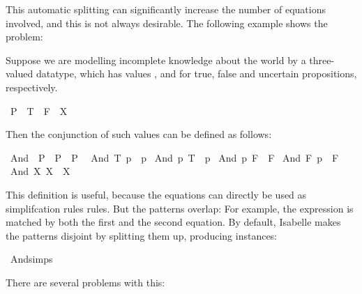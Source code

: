 \begin{isabellebody}
\begin{isamarkuptext}
  This automatic splitting can significantly increase the number of
  equations involved, and this is not always desirable. The following
  example shows the problem:
  
  Suppose we are modelling incomplete knowledge about the world by a
  three-valued datatype, which has values , 
  and  for true, false and uncertain propositions, respectively.%
\end{isamarkuptext}%
\isamarkuptrue%
\isamarkupfalse%
\ P{}\ {\isacharequal}\ T\ {\isacharbar}\ F\ {\isacharbar}\ X%
\begin{isamarkuptext}%
\noindent Then the conjunction of such values can be defined as follows:%
\end{isamarkuptext}%
\isamarkuptrue%
\isamarkupfalse%
\ And\ {\isacharcolon}{\isacharcolon}\ {\isachardoublequoteopen}P{}\ {\isasymRightarrow}\ P{}\ {\isasymRightarrow}\ P{}{\isachardoublequoteclose}\isanewline
{}\isanewline
\ \ {\isachardoublequoteopen}And\ T\ p\ {\isacharequal}\ p{\isachardoublequoteclose}\isanewline
{\isacharbar}\ {\isachardoublequoteopen}And\ p\ T\ {\isacharequal}\ p{\isachardoublequoteclose}\isanewline
{\isacharbar}\ {\isachardoublequoteopen}And\ p\ F\ {\isacharequal}\ F{\isachardoublequoteclose}\isanewline
{\isacharbar}\ {\isachardoublequoteopen}And\ F\ p\ {\isacharequal}\ F{\isachardoublequoteclose}\isanewline
{\isacharbar}\ {\isachardoublequoteopen}And\ X\ X\ {\isacharequal}\ X{\isachardoublequoteclose}%
\begin{isamarkuptext}%
This definition is useful, because the equations can directly be used
  as simplifcation rules rules. But the patterns overlap: For example,
  the expression  is matched by both the first and
  the second equation. By default, Isabelle makes the patterns disjoint by
  splitting them up, producing instances:%
\end{isamarkuptext}%
\isamarkuptrue%
\isamarkupfalse%
\ And{\isachardot}simps%
\begin{isamarkuptext}%
  
  \vspace*{1em}
  \noindent There are several problems with this:


\end{isamarkuptext}
\end{isabellebody}
